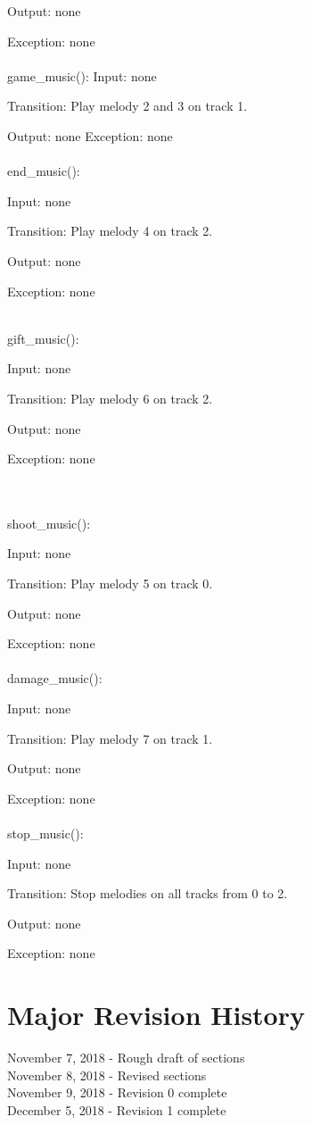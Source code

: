 \documentclass[12,english]{article}
\begin{document}
			Output: none
			
			Exception: none\\
			\\
			game\_music():
			Input: none
			
			Transition: Play melody 2 and 3 on track 1.
			
			Output: none
			Exception: none\\
			\\
			end\_music():
			
			Input: none
			
			Transition: Play melody 4 on track 2.
			
			Output: none
			
			Exception: none\\
			\\
			{\color{red}gift\_music():
			
			Input: none
			
			Transition: Play melody 6 on track 2.
			
			Output: none
			
			Exception: none}\\
			\\
			shoot\_music():
			
			Input: none
			
			Transition: Play melody 5 on track 0.
			
			Output: none
			
			Exception: none\\
			\\
			damage\_music():
			
			Input: none
			
			Transition: Play melody 7 on track 1.
			
			Output: none
			
			Exception: none\\
			\\
			stop\_music():
			
			Input: none
			
			Transition: Stop melodies on all tracks from 0 to 2.
			
			Output: none
			
			Exception: none
			
\section{Major Revision History}
November 7, 2018 - Rough draft of sections\\
November 8, 2018 - Revised sections \\
November 9, 2018 - Revision 0 complete\\
December 5, 2018 - Revision 1 complete\\


			
\end{document}
